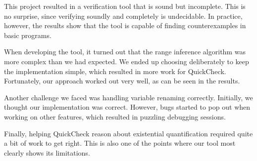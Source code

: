\documentclass[a4paper]{article}
\begin{document}
This project resulted in a verification tool that is sound but incomplete.
This is no surprise, since verifying soundly and completely is undecidable.
In practice, however, the results show that the tool is capable of finding
counterexamples in basic programs.

When developing the tool, it turned out that the range inference algorithm
was more complex than we had expected. We ended up choosing deliberately to
keep the implementation simple, which resulted in more work for QuickCheck.
Fortunately, our approach worked out very well, as can be seen in the results.

Another challenge we faced was handling variable renaming correctly. Initially,
we thought our implementation was correct. However, bugs started to pop out when
working on other features, which resulted in puzzling debugging sessions.

Finally, helping QuickCheck reason about existential quantification required
quite a bit of work to get right. This is also one of the points where our tool
most clearly shows its limitations.



\end{document}
